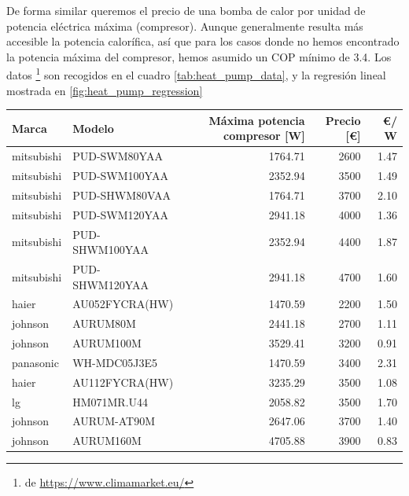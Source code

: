 De forma similar queremos el precio de una bomba de calor por unidad de
potencia eléctrica máxima (compresor). Aunque generalmente resulta más
accesible la potencia calorífica, así que para los casos donde no hemos
encontrado la potencia máxima del compresor, hemos asumido un COP mínimo de
3.4. Los datos \footnote{de \url{https://www.climamarket.eu/}} son recogidos en
el cuadro \ref{tab:heat_pump_data}, y la regresión lineal mostrada en
\ref{fig:heat_pump_regression}

\begin{table}[htbp]
	\centering
	\begin{tabular}{llrrr}
		\toprule
		Marca      & Modelo         & Máxima potencia compresor [W] & Precio [\euro] & \euro / W \\
		\midrule
		mitsubishi & PUD-SWM80YAA   & 1764.71                       & 2600           & 1.47      \\
		mitsubishi & PUD-SWM100YAA  & 2352.94                       & 3500           & 1.49      \\
		mitsubishi & PUD-SHWM80VAA  & 1764.71                       & 3700           & 2.10      \\
		mitsubishi & PUD-SWM120YAA  & 2941.18                       & 4000           & 1.36      \\
		mitsubishi & PUD-SHWM100YAA & 2352.94                       & 4400           & 1.87      \\
		mitsubishi & PUD-SHWM120YAA & 2941.18                       & 4700           & 1.60      \\
		haier      & AU052FYCRA(HW) & 1470.59                       & 2200           & 1.50      \\
		johnson    & AURUM80M       & 2441.18                       & 2700           & 1.11      \\
		johnson    & AURUM100M      & 3529.41                       & 3200           & 0.91      \\
		panasonic  & WH-MDC05J3E5   & 1470.59                       & 3400           & 2.31      \\
		haier      & AU112FYCRA(HW) & 3235.29                       & 3500           & 1.08      \\
		lg         & HM071MR.U44    & 2058.82                       & 3500           & 1.70      \\
		johnson    & AURUM-AT90M    & 2647.06                       & 3700           & 1.40      \\
		johnson    & AURUM160M      & 4705.88                       & 3900           & 0.83      \\

\end{tabular}
\end{table}
